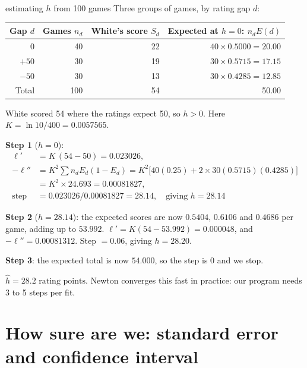 \documentclass[11pt,a4paper]{article}
\begin{document}
\begin{example}{estimating $h$ from 100 games}
Three groups of games, by rating gap $d$:
\begin{center}
\small
\begin{tabular}{@{}rrrr@{}}
\toprule
Gap $d$ & Games $n_d$ & White's score $S_d$ & Expected at $h=0$: $n_d E(d)$ \\
\midrule
$0$ & 40 & 22 & $40 \times 0.5000 = 20.00$ \\
$+50$ & 30 & 19 & $30 \times 0.5715 = 17.15$ \\
$-50$ & 30 & 13 & $30 \times 0.4285 = 12.85$ \\
\midrule
Total & 100 & 54 & 50.00 \\
\bottomrule
\end{tabular}
\end{center}
White scored 54 where the ratings expect 50, so $h > 0$. Here $K = \ln 10/400 = 0.0057565$.

\textbf{Step 1} ($h = 0$):
\begin{align*}
\ell' &= K\,(54 - 50) = 0.023026, \\
-\ell'' &= K^2 \textstyle\sum n_d E_d(1-E_d) = K^2 \big[40(0.25) + 2 \times 30(0.5715)(0.4285)\big] \\
        &= K^2 \times 24.693 = 0.00081827, \\
\text{step} &= 0.023026 / 0.00081827 = 28.14, \quad\text{giving } h = 28.14
\end{align*}

\textbf{Step 2} ($h = 28.14$): the expected scores are now $0.5404$, $0.6106$ and $0.4686$ per
game, adding up to $53.992$. $\ell' = K(54 - 53.992) = 0.000048$, and $-\ell'' = 0.00081312$.
Step $= 0.06$, giving $h = 28.20$.

\textbf{Step 3}: the expected total is now $54.000$, so the step is 0 and we stop.

$\boxed{\hat h = 28.2 \text{ rating points}}$. Newton converges this fast in practice: our program
needs 3 to 5 steps per fit.
\end{example}

\section{How sure are we: standard error and confidence interval}\label{sec:ci}
\end{document}
